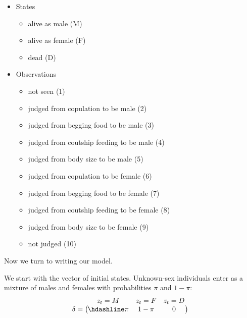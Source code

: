 \documentclass[
  12pt,
]{krantz}
\providecommand{\tightlist}{%
  \setlength{\itemsep}{0pt}\setlength{\parskip}{0pt}}
\begin{document}
\begin{itemize}
\tightlist
\item
  States

  \begin{itemize}
  \tightlist
  \item
    alive as male (M)
  \item
    alive as female (F)
  \item
    dead (D)
  \end{itemize}
\item
  Observations

  \begin{itemize}
  \tightlist
  \item
    not seen (1)
  \item
    judged from copulation to be male (2)
  \item
    judged from begging food to be male (3)
  \item
    judged from coutship feeding to be male (4)
  \item
    judged from body size to be male (5)
  \item
    judged from copulation to be female (6)
  \item
    judged from begging food to be female (7)
  \item
    judged from coutship feeding to be female (8)
  \item
    judged from body size to be female (9)
  \item
    not judged (10)
  \end{itemize}
\end{itemize}

Now we turn to writing our model.

We start with the vector of initial states. Unknown-sex individuals enter as a mixture of males and females with probabilities \(\pi\) and \(1-\pi\):
\[\begin{matrix}
& \\
\mathbf{\delta} =
  \left ( \vphantom{ \begin{matrix} 12 \end{matrix} } \right .
          \end{matrix}
          \hspace{-1.2em}
          \begin{matrix}
          z_t=M & z_t=F & z_t=D \\ \hdashline
          \pi & 1 - \pi & 0\\
          \end{matrix}
          \hspace{-0.2em}
          \begin{matrix}
          & \\
          \left . \vphantom{ \begin{matrix} 12 \end{matrix} } \right )
\begin{matrix}
\end{matrix}
\end{matrix}\]
\end{document}
